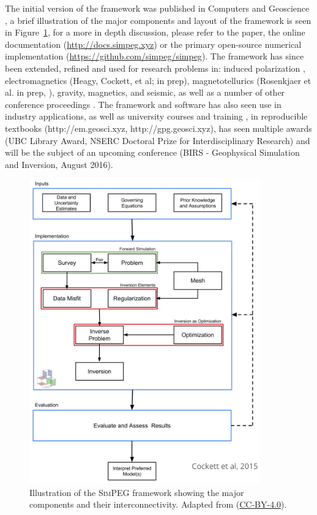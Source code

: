 \documentclass[11pt]{article}
\newcommand{\SimPEG}{\textsc{SimPEG}\xspace}
\begin{document}
The initial version of the framework was published in Computers and Geoscience \citep{Cockett2015}, a brief illustration of the major components and layout of the framework is seen in Figure~\ref{fig:simpeg}, for a more in depth discussion, please refer to the paper, the online documentation (\url{http://docs.simpeg.xyz}) or the primary open-source numerical implementation (\url{https://github.com/simpeg/simpeg}).
The framework has since been extended, refined and used for research problems in: induced polarization \citep{Kang2016}, electromagnetics (Heagy, Cockett, et al; in prep), magnetotellurics (Rosenkjaer et al. in prep, \cite{Rosenkjaer2015AGU}), gravity, magnetics, and seismic, as well as a number of other conference proceedings \citep{Cockett2015a,Rosenkjaer2015}. The framework and software has also seen use in industry applications, as well as university courses and training \citep{Heagy2015b,HeagySciPy2015}, in reproducible textbooks (http://em.geosci.xyz, http://gpg.geosci.xyz), has seen multiple awards (UBC Library Award, NSERC Doctoral Prize for Interdisciplinary Research) and will be the subject of an upcoming conference (BIRS - Geophysical Simulation and Inversion, August 2016).

\begin{figure}[ht!]
\centering
\includegraphics[width=10cm]{simpegFramework.png}
\caption{Illustration of the \SimPEG framework showing the major components and their interconnectivity. Adapted from \cite{Cockett2015} (\href{http://creativecommons.org/licenses/by/4.0/}{CC-BY-4.0}).}
\label{fig:simpeg}
\end{figure}
\end{document}
